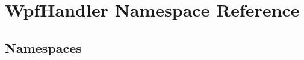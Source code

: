 \hypertarget{namespace_wpf_handler}{}\section{Wpf\+Handler Namespace Reference}
\label{namespace_wpf_handler}
\subsection*{Namespaces}
\begin{DoxyCompactItemize}
\end{DoxyCompactItemize}
